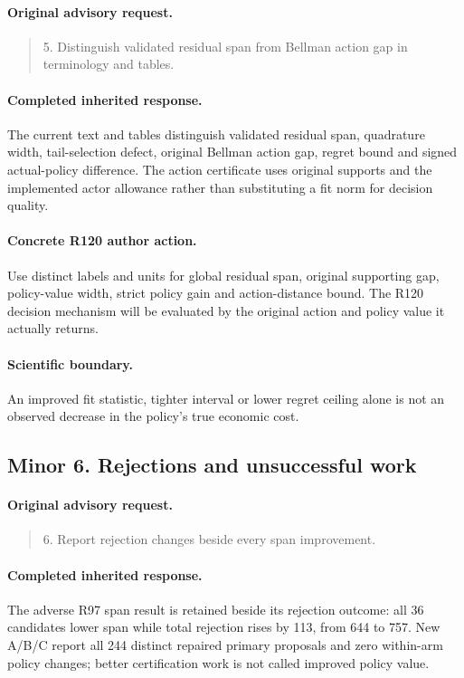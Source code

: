 \paragraph{Original advisory request.}
\begin{quote}
5. Distinguish validated residual span from Bellman action gap in terminology and tables.
\end{quote}
\paragraph{Completed inherited response.}
The current text and tables distinguish validated residual span, quadrature width, tail-selection defect, original Bellman action gap, regret bound and signed actual-policy difference. The action certificate uses original supports and the implemented actor allowance rather than substituting a fit norm for decision quality.
\paragraph{Concrete R120 author action.}
Use distinct labels and units for global residual span, original supporting gap, policy-value width, strict policy gain and action-distance bound. The R120 decision mechanism will be evaluated by the original action and policy value it actually returns.
\paragraph{Scientific boundary.}
An improved fit statistic, tighter interval or lower regret ceiling alone is not an observed decrease in the policy's true economic cost.

\subsection{Minor 6. Rejections and unsuccessful work}
\label{response120:minor-6}
\paragraph{Original advisory request.}
\begin{quote}
6. Report rejection changes beside every span improvement.
\end{quote}
\paragraph{Completed inherited response.}
The adverse R97 span result is retained beside its rejection outcome: all 36 candidates lower span while total rejection rises by 113, from 644 to 757. New A/B/C report all 244 distinct repaired primary proposals and zero within-arm policy changes; better certification work is not called improved policy value.
